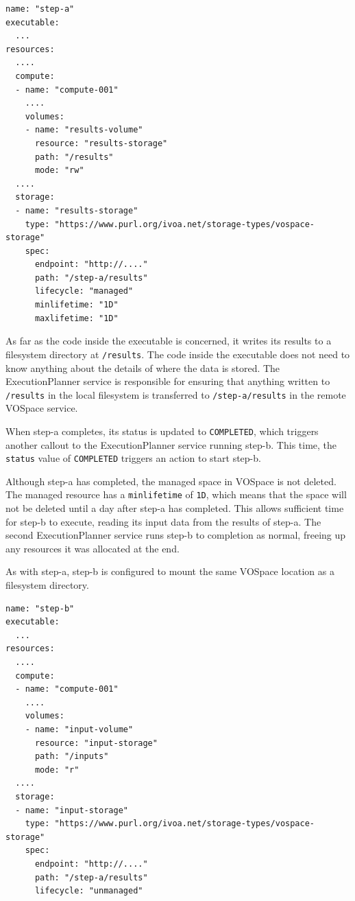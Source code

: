\documentclass[11pt,a4paper]{ivoa}
\newcommand{\vospace} {VOSpace}
\newcommand{\execplanner} {ExecutionPlanner}
\newcommand{\codeword}[1] {\texttt{#1}}
\begin{document}
\begin{lstlisting}[]
name: "step-a"
executable:
  ...
resources:
  ....
  compute:
  - name: "compute-001"
    ....
    volumes:
    - name: "results-volume"
      resource: "results-storage"
      path: "/results"
      mode: "rw"
  ....
  storage:
  - name: "results-storage"
    type: "https://www.purl.org/ivoa.net/storage-types/vospace-storage"
    spec:
      endpoint: "http://...."
      path: "/step-a/results"
      lifecycle: "managed"
      minlifetime: "1D"
      maxlifetime: "1D"
\end{lstlisting}

As far as the code inside the executable is concerned, it writes its results to a
filesystem directory at \codeword{/results}.
The code inside the executable does not need to know anything about the
details of where the data is stored.
The \execplanner{} service is responsible for ensuring that anything written to
\codeword{/results} in the local filesystem is transferred to \codeword{/step-a/results}
in the remote \vospace{} service.

When step-a completes, its status is updated to \codeword{COMPLETED},
which triggers another callout to the \execplanner{} service running step-b.
This time, the \codeword{status} value of \codeword{COMPLETED} triggers
an action to start step-b.

Although step-a has completed, the managed space in \vospace{} is not deleted.
The managed resource has a \codeword{minlifetime} of \codeword{1D},
which means that the space will not be deleted until a day after step-a has completed.
This allows sufficient time for step-b to execute, reading its input data
from the results of step-a.
The second \execplanner{} service runs step-b to completion as normal,
freeing up any resources it was allocated at the end.

As with step-a, step-b is configured to mount the same \vospace{} location
as a filesystem directory.

\begin{lstlisting}[]
name: "step-b"
executable:
  ...
resources:
  ....
  compute:
  - name: "compute-001"
    ....
    volumes:
    - name: "input-volume"
      resource: "input-storage"
      path: "/inputs"
      mode: "r"
  ....
  storage:
  - name: "input-storage"
    type: "https://www.purl.org/ivoa.net/storage-types/vospace-storage"
    spec:
      endpoint: "http://...."
      path: "/step-a/results"
      lifecycle: "unmanaged"
\end{lstlisting}
\end{document}
